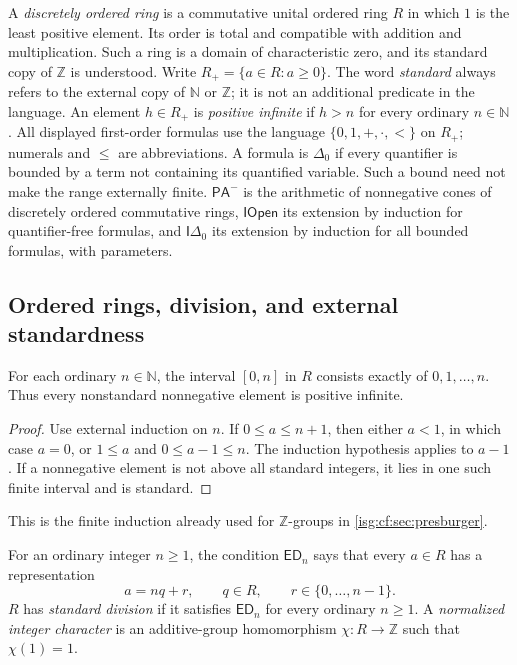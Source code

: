 \documentclass[11pt]{article}
\theoremstyle{definition}
\theoremstyle{remark}
\newcommand{\Z}{\mathbb{Z}}
\newcommand{\N}{\mathbb{N}}
\newcommand{\ED}{\mathsf{ED}}
\newcommand{\Iopen}{\mathsf{IOpen}}
\newcommand{\Idelta}{\mathsf{I}\Delta_0}
\newcommand{\PAminus}{\mathsf{PA}^{-}}
\begin{document}
A \emph{discretely ordered ring} is a commutative unital ordered ring $R$
in which $1$ is the least positive element. Its order is total and
compatible with addition and multiplication. Such a ring is a domain of
characteristic zero, and its standard copy of $\Z$ is understood. Write
$R_+=\{a\in R:a\ge0\}$. The word \emph{standard} always refers to the
external copy of $\N$ or $\Z$; it is not an additional predicate in the
language. An element $h\in R_+$ is \emph{positive infinite} if $h>n$ for
every ordinary $n\in\N$. All displayed first-order formulas use the
language $\{0,1,+,\cdot,<\}$ on $R_+$; numerals and $\le$ are
abbreviations. A formula is $\Delta_0$ if every quantifier is bounded by a
term not containing its quantified variable. Such a bound need not make
the range externally finite. $\PAminus$ is the arithmetic of nonnegative
cones of discretely ordered commutative rings, $\Iopen$ its extension by
induction for quantifier-free formulas, and $\Idelta$ its extension by
induction for all bounded formulas, with parameters.

\subsection{Ordered rings, division, and external standardness}\label{isg:sc:sec:setup}

\begin{lemma}\label{isg:sc:lem:finite}
For each ordinary $n\in\N$, the interval $[0,n]$ in $R$ consists exactly of
$0,1,\ldots,n$. Thus every nonstandard nonnegative element is positive
infinite.
\end{lemma}
\begin{proof}
Use external induction on $n$. If $0\le a\le n+1$, then either $a<1$, in
which case $a=0$, or $1\le a$ and $0\le a-1\le n$. The induction
hypothesis applies to $a-1$. If a nonnegative element is not above all
standard integers, it lies in one such finite interval and is standard.
\end{proof}
This is the finite induction already used for $\Z$-groups in
\cref{isg:cf:sec:presburger}.

\begin{definition}\label{isg:sc:def:division}
For an ordinary integer $n\ge1$, the condition $\ED_n$ says that every
$a\in R$ has a representation
\[
 a=nq+r,\qquad q\in R,\qquad r\in\{0,\ldots,n-1\}.
\]
$R$ has \emph{standard division} if it satisfies $\ED_n$ for every
ordinary $n\ge1$. A \emph{normalized integer character} is an
additive-group homomorphism $\chi:R\to\Z$ such that $\chi(1)=1$.
\end{definition}
\end{document}
